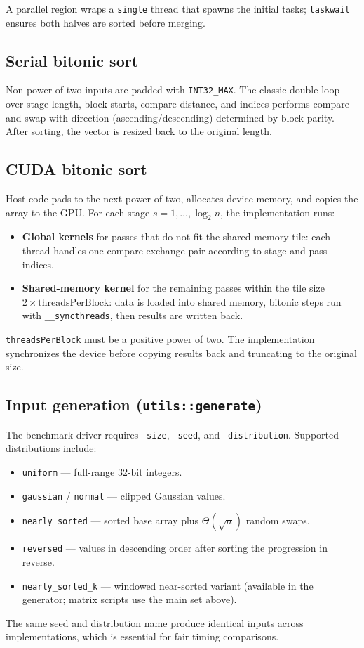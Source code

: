 \documentclass[11pt,a4paper]{article}
\begin{document}
A parallel region wraps a \texttt{single} thread that spawns the initial tasks; \texttt{taskwait} ensures both halves are sorted before merging.

\subsection{Serial bitonic sort}
Non-power-of-two inputs are padded with \texttt{INT32\_MAX}. The classic double loop over stage length, block starts, compare distance, and indices performs compare-and-swap with direction (ascending/descending) determined by block parity. After sorting, the vector is resized back to the original length.

\subsection{CUDA bitonic sort}
Host code pads to the next power of two, allocates device memory, and copies the array to the GPU. For each stage $s = 1,\ldots,\log_2 n$, the implementation runs:
\begin{itemize}[noitemsep]
  \item \textbf{Global kernels} for passes that do not fit the shared-memory tile: each thread handles one compare-exchange pair according to stage and pass indices.
  \item \textbf{Shared-memory kernel} for the remaining passes within the tile size $2 \times \text{threadsPerBlock}$: data is loaded into shared memory, bitonic steps run with \texttt{\_\_syncthreads}, then results are written back.
\end{itemize}
\texttt{threadsPerBlock} must be a positive power of two. The implementation synchronizes the device before copying results back and truncating to the original size.

\subsection{Input generation (\texttt{utils::generate})}
The benchmark driver requires \texttt{--size}, \texttt{--seed}, and \texttt{--distribution}. Supported distributions include:
\begin{itemize}[noitemsep]
  \item \texttt{uniform} — full-range 32-bit integers.
  \item \texttt{gaussian} / \texttt{normal} — clipped Gaussian values.
  \item \texttt{nearly\_sorted} — sorted base array plus $\Theta(\sqrt{n})$ random swaps.
  \item \texttt{reversed} — values in descending order after sorting the progression in reverse.
  \item \texttt{nearly\_sorted\_k} — windowed near-sorted variant (available in the generator; matrix scripts use the main set above).
\end{itemize}
The same seed and distribution name produce identical inputs across implementations, which is essential for fair timing comparisons.
\end{document}
